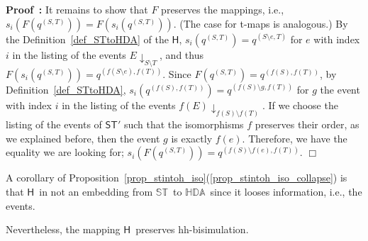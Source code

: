 \documentclass[submission,copyright,creativecommons]{eptcs}
\newenvironment{proof}[1][\!\!\,]{\vspace{1ex}\noindent\textbf{Proof #1: }}{\hfill$\Box$\vspace{2ex}}
\newcommand{\refeq}[1]{(\ref{#1})}
\newcounter{case}
\newcommand\ST{\ensuremath{\mathsf{ST}}}
\newcommand\allST{\ensuremath{\mathbb{ST}}}
\newcommand\allHDA{\ensuremath{\mathbb{HDA}}}
\newcommand\stintoh{\ensuremath{\mathsf{H}}}
\begin{document}
\begin{proof}
It remains to show that $F$ preserves the mappings, i.e., $s_{i}(F(q^{(S,T)}))=F(s_{i}(q^{(S,T)}))$. (The case for t-maps is analogous.) By the Definition~\ref{def_STtoHDA} of the \stintoh, $s_{i}(q^{(S,T)})=q^{(S\setminus e,T)}$ for $e$ with index $i$ in the listing of the events $E\!\downarrow_{S\setminus T}$, and thus $F(s_{i}(q^{(S,T)}))=q^{(f(S\setminus e),f(T))}$. Since $F(q^{(S,T)})=q^{(f(S),f(T))}$, by Definition~\ref{def_STtoHDA}, $s_{i}(q^{(f(S),f(T))})=q^{(f(S)\setminus g,f(T))}$ for $g$  the event with index $i$ in the listing of the events $f(E)\!\downarrow_{f(S)\setminus f(T)}$. If we choose the listing of the events of $\ST'$ such that the isomorphisms $f$ preserves their order, as we explained before, then the event $g$ is exactly $f(e)$. Therefore, we have the equality we are looking for; $s_{i}(F(q^{(S,T)}))=q^{(f(S)\setminus f(e),f(T))}$.
\end{proof}

A corollary of Proposition~\ref{prop_stintoh_iso}\refeq{prop_stintoh_iso_collapse} is that \stintoh\ in not an embedding from \allST\ to \allHDA\ since it looses information, i.e., the events.

Nevertheless, the mapping \stintoh\ preserves hh-bisimulation.
\end{document}
